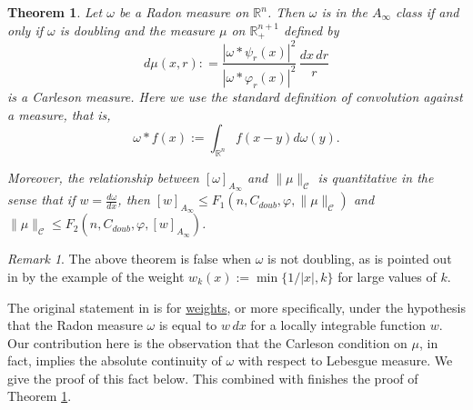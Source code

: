 \documentclass[11pt, a4paper,leqno]{amsart}
\theoremstyle{plain}
\newtheorem{theorem}[equation]{Theorem}
\theoremstyle{definition}
\theoremstyle{remark}
\newtheorem{remark}[equation]{Remark}
\numberwithin{equation}{section}
\newcommand{\rn}{\mathbb{R}^n}
\newcommand{\ree}{\mathbb{R}^{n+1}}
\begin{document}
\begin{theorem}\label{FKPthrm.thrm}
Let $\omega$ be a Radon measure on $\mathbb{R}^n$.
Then $\omega$ is in the $A_\infty$ class if and only if $\omega$ is doubling and the measure $\mu$ on $\ree_+$ defined by 
\begin{equation}\label{def:mu}
d\mu(x,r): = \frac{|\omega \ast \psi_r(x)|^2}{|\omega \ast \varphi_r(x)|^2} \, \frac{dx \, dr}{r}
\end{equation}
is a Carleson measure. 
Here we use the standard definition of convolution against a measure, that is,
\[\omega \ast f(x) := \int_{\rn} f(x-y) d\omega(y).\]

Moreover, the relationship between $[\omega]_{A_\infty}$ and  $ \|\mu\|_{\mathcal{C}}$ is quantitative in the sense that if $w = \tfrac{d\omega}{dx}$, then  $[w]_{A_\infty} \le F_1(n, C_{doub},\varphi,  \|\mu\|_{\mathcal{C}})$ and $ \|\mu\|_{\mathcal{C}} \le F_2(n, C_{doub}, \varphi, [w]_{A_\infty})$.
\end{theorem}
\begin{remark}	
	The above theorem is false when $\omega$ is not doubling, as is pointed out in \cite{FKP} by the example of the weight $w_k(x) := \min\{1/|x|, k \} $	for large values of $k$.
\end{remark}


The original statement in \cite[Theorem 3.1]{FKP} is for \underline{weights}, or more specifically, under the hypothesis that the Radon measure $\omega$ is equal to $w \, dx$ for a locally integrable function $w$. Our contribution here is the observation that the Carleson condition on $\mu$, in fact, implies the absolute continuity of $\omega$ with respect to Lebesgue measure. We give the proof of this fact below. This combined with \cite[Theorem 2.15]{FKP} finishes the proof of Theorem \ref{FKPthrm.thrm}.
\end{document}
